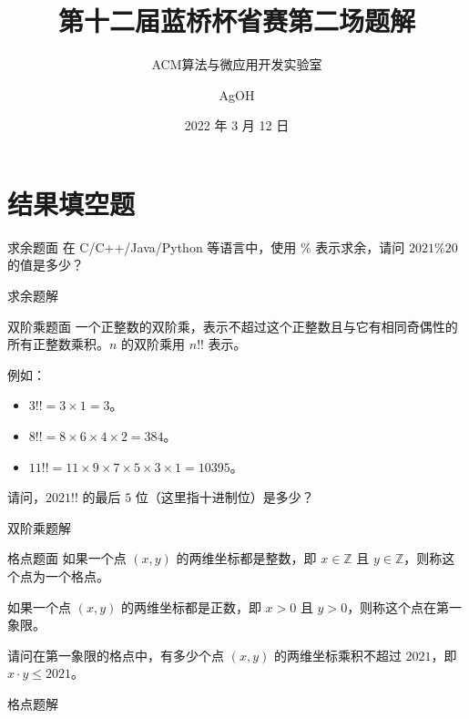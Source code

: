 \documentclass{pptt}
\title{第十二届蓝桥杯省赛第二场题解}
\author{ACM算法与微应用开发实验室 \and AgOH}
\date{2022 年 3 月 12 日}
\begin{document}
\maketitle

\section{结果填空题}

\begin{frame}{求余}{题面}
    在 C/C++/Java/Python 等语言中，使用 $\%$ 表示求余，请问 $2021 \% 20$ 的值是多少？
\end{frame}

\begin{frame}{求余}{题解}

\end{frame}

\begin{frame}{双阶乘}{题面}
    一个正整数的双阶乘，表示不超过这个正整数且与它有相同奇偶性的所有正整数乘积。$n$ 的双阶乘用 $n!!$ 表示。

    例如：

    \begin{itemize}
        \item $3!! = 3 \times 1 = 3$。
        \item $8!! = 8 \times 6 \times 4 \times 2 = 384$。
        \item $11!! = 11 \times 9 \times 7 \times 5 \times 3 \times 1 = 10395$。
    \end{itemize}

    请问，$2021!!$ 的最后 $5$ 位（这里指十进制位）是多少？
\end{frame}

\begin{frame}{双阶乘}{题解}
\end{frame}

\begin{frame}{格点}{题面}
    如果一个点 $(x,y)$ 的两维坐标都是整数，即 $x \in \mathbb{Z}$ 且 $y \in \mathbb{Z}$，则称这个点为一个格点。

    如果一个点 $(x,y)$ 的两维坐标都是正数，即 $x>0$ 且 $y>0$，则称这个点在第一象限。

    请问在第一象限的格点中，有多少个点 $(x,y)$ 的两维坐标乘积不超过 $2021$，即 $x \cdot y \leq 2021$。
\end{frame}

\begin{frame}{格点}{题解}
\end{frame}
\end{document}
